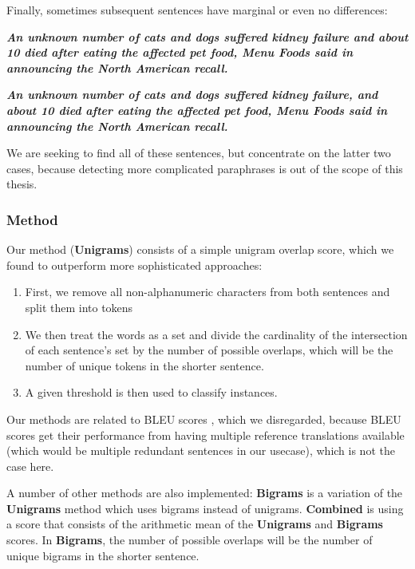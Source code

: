 \documentclass[a4paper,10pt]{scrartcl}
\theoremstyle{style}
\begin{document}
Finally, sometimes subsequent sentences have marginal or even no differences:

\begin{framed}
\textit{\textbf{An unknown number of cats and dogs suffered kidney failure and about 10 died after eating the affected pet food, Menu Foods said in announcing the North American recall.}}

\textit{\textbf{An unknown number of cats and dogs suffered kidney failure, and about 10 died after eating the affected pet food, Menu Foods said in announcing the North American recall.}}
\end{framed}

We are seeking to find all of these sentences, but concentrate on the latter two cases, because detecting more complicated paraphrases is out of the scope of this thesis.%

\subsubsection{Method}
\label{s_unigrams}

Our method (\textbf{Unigrams}) consists of a simple unigram overlap score, which we found to outperform more sophisticated approaches:

\begin{enumerate}
\item First, we remove all non-alphanumeric characters from both sentences and split them into tokens
\item We then treat the words as a set and divide the cardinality of the intersection of each sentence's set by the number of possible overlaps, which will be the number of unique tokens in the shorter sentence.
\item A given threshold is then used to classify instances.
\end{enumerate}

Our methods are related to BLEU scores \citep{papineni2002bleu}, which we disregarded, because BLEU scores get their performance from having multiple reference translations available (which would be multiple redundant sentences in our usecase), which is not the case here.

A number of other methods are also implemented: \textbf{Bigrams} is a variation of the \textbf{Unigrams} method which uses bigrams instead of unigrams. \textbf{Combined} is using a score that consists of the arithmetic mean of the \textbf{Unigrams} and \textbf{Bigrams} scores. In \textbf{Bigrams}, the number of possible overlaps will be the number of unique bigrams in the shorter sentence.
\end{document}
